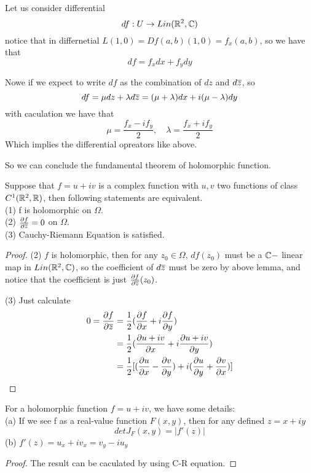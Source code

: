 \documentclass[en,geye,blue,normal,12pt,bibend=bibtex]{elegantnote}
\begin{document}
Let us consider differential \[df: U \to Lin(\mathbb{R}^2,\mathbb{C})\] notice that in differnetial \(L(1,0) = Df(a,b)(1,0) =f_x(a,b)\), so we have that 
\[df = f_xdx+f_ydy\]

Nowe if we expect to write \(df\) as the combination of \(dz\) and \(d\overline{z}\), so \[df = \mu dz + \lambda d\overline{z} = (\mu + \lambda)dx + i(\mu-\lambda)dy\]
with caculation we have that 
\[\mu  = \frac{f_x-if_y}{2}, \quad \lambda = \frac{f_x+if_y}{2}\]
Which implies the differential opreators like above.

So we can conclude the fundamental theorem of holomorphic function.
\begin{theorem}
    Suppose that \(f =  u+ iv\) is a complex function with \(u,v\) two functions of class \(C^1(\mathbb{R}^2,\mathbb{R})\), then following statements are equivalent.
    \\(1) f is holomorphic on \(\Omega\).
    \\(2) \(\frac{\partial f}{\partial \overline{z}} = 0\) on \(\Omega\).
    \\(3) Cauchy-Riemann Equation is satisfied.

    \begin{proof}
        (2) \(f\) is holomorphic, then for any \(z_0 \in \Omega\), \(df(z_0)\) must be a \(\mathbb{C}-\) linear map in \(Lin(\mathbb{R}^2,\mathbb{C})\), so the coefficient of \(d\overline{z}\) must be zero by above lemma, and notice that the coefficient is just \(\frac{\partial f}{\partial \overline{z}}(z_0)\).

        (3) Just calculate
        \begin{align*}
            0 = \frac{\partial f}{\partial \overline{z}} &= \frac{1}{2}(\frac{\partial f}{\partial x}+i\frac{\partial f}{\partial y}) \\
            &= \frac{1}{2}(\frac{\partial u+iv}{\partial x} +i \frac{\partial u+iv}{\partial y}) \\
            &= \frac{1}{2}[(\frac{\partial u}{\partial x}- \frac{\partial v}{\partial y})+i(\frac{\partial u}{\partial y}+\frac{\partial v}{\partial x})] 
        \end{align*}
    \end{proof}

    \begin{corollary}
        For a holomorphic function \(f = u+iv\), we have some details:\\
        (a) If we see f as a real-value function \(F(x,y)\), then for any defined \(z = x+iy\)
        \[det J_F(x,y) = |f'(z)|\]
        (b) \(f'(z) = u_x + iv_x = v_y-iu_y\)

        \begin{proof}
            The result can be caculated by using C-R equation.
        \end{proof}
    \end{corollary}
\end{theorem}
\end{document}
